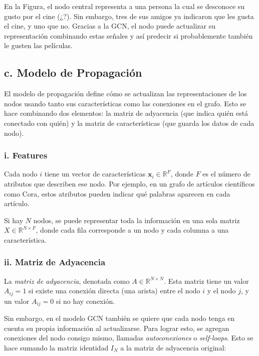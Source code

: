 \documentclass[11pt]{article} %
\begin{document}
\vspace{0.5em}
En la Figura, el nodo central representa a una persona la cual se desconoce su gusto por el cine (¿?). Sin embargo, tres de sus amigos ya indicaron que les gusta el cine, y uno que no. Gracias a la GCN, el nodo puede actualizar su representación combinando estas señales y así predecir si probablemente también le gusten las películas.




\subsection{c. Modelo de Propagación}

El modelo de propagación define cómo se actualizan las representaciones de los nodos usando tanto sus características como las conexiones en el grafo. Esto se hace combinando dos elementos: la matriz de adyacencia (que indica quién está conectado con quién) y la matriz de características (que guarda los datos de cada nodo).

\subsubsection{i. Features}

Cada nodo $i$ tiene un vector de características $\mathbf{x}_i \in \mathbb{R}^F$, donde $F$ es el número de atributos que describen ese nodo. Por ejemplo, en un grafo de artículos científicos como Cora, estos atributos pueden indicar qué palabras aparecen en cada artículo.

Si hay $N$ nodos, se puede representar toda la información en una sola matriz $X \in \mathbb{R}^{N \times F}$, donde cada fila corresponde a un nodo y cada columna a una característica.

\subsubsection{ii. Matriz de Adyacencia}

La \textit{matriz de adyacencia}, denotada como $A \in \mathbb{R}^{N \times N}$. Esta matriz tiene un valor $A_{ij} = 1$ si existe una conexión directa (una arista) entre el nodo $i$ y el nodo $j$, y un valor $A_{ij} = 0$ si no hay conexión.

Sin embargo, en el modelo GCN también se quiere que cada nodo tenga en cuenta su propia información al actualizarse. Para lograr esto, se agregan conexiones del nodo consigo mismo, llamadas \textit{autoconexiones} o \textit{self-loops}. Esto se hace sumando la matriz identidad $I_N$ a la matriz de adyacencia original:
\end{document}
